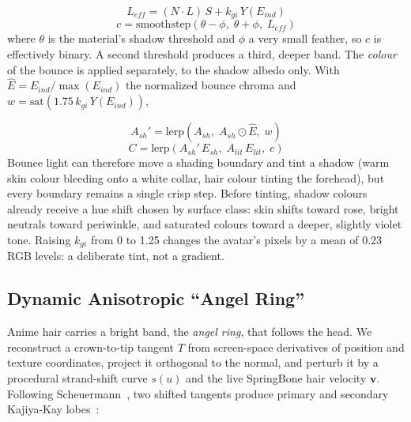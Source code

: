 \documentclass[conference]{IEEEtran}
\begin{document}
\begin{equation}
L_{eff} = (N \cdot L)\,S + k_{gi}\,Y(E_{ind})
\label{eq:leff}
\end{equation}
\begin{equation}
c = \mathrm{smoothstep}(\theta - \phi,\; \theta + \phi,\; L_{eff})
\label{eq:cel}
\end{equation}
where $\theta$ is the material's shadow threshold and $\phi$ a very small feather, so $c$ is effectively binary. A second threshold produces a third, deeper band. The \textit{colour} of the bounce is applied separately, to the shadow albedo only. With $\hat{E} = E_{ind}/\max(E_{ind})$ the normalized bounce chroma and $w = \mathrm{sat}(1.75\,k_{gi}\,Y(E_{ind}))$,

\begin{equation}
A_{sh}' = \mathrm{lerp}\!\left(A_{sh},\; A_{sh} \odot \hat{E},\; w\right)
\label{eq:tint}
\end{equation}
\begin{equation}
C = \mathrm{lerp}\!\left(A_{sh}'\,E_{sh},\; A_{lit}\,E_{lit},\; c\right)
\label{eq:final}
\end{equation}
Bounce light can therefore move a shading boundary and tint a shadow (warm skin colour bleeding onto a white collar, hair colour tinting the forehead), but every boundary remains a single crisp step. Before tinting, shadow colours already receive a hue shift chosen by surface class: skin shifts toward rose, bright neutrals toward periwinkle, and saturated colours toward a deeper, slightly violet tone. Raising $k_{gi}$ from 0 to 1.25 changes the avatar's pixels by a mean of 0.23 RGB levels: a deliberate tint, not a gradient.


\subsection{Dynamic Anisotropic ``Angel Ring''}
Anime hair carries a bright band, the \textit{angel ring}, that follows the head. We reconstruct a crown-to-tip tangent $T$ from screen-space derivatives of position and texture coordinates, project it orthogonal to the normal, and perturb it by a procedural strand-shift curve $s(u)$ and the live SpringBone hair velocity $\mathbf{v}$. Following Scheuermann~\cite{scheuermann}, two shifted tangents produce primary and secondary Kajiya-Kay lobes~\cite{kajiyakay}:
\end{document}
